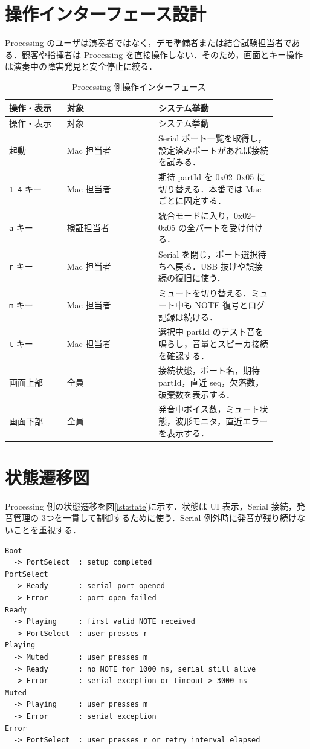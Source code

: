 \documentclass[lualatex,book,openany,paper=a4paper,jafontsize=11.5pt,jafontscale=1.05]{jlreq}
\begin{document}
\section{操作インターフェース設計}
Processing のユーザは演奏者ではなく，デモ準備者または結合試験担当者である．観客や指揮者は
Processing を直接操作しない．そのため，画面とキー操作は演奏中の障害発見と安全停止に絞る．

\begin{longtable}{p{0.19\linewidth}p{0.30\linewidth}p{0.39\linewidth}}
\caption{Processing 側操作インターフェース}\label{tab:ui}\\
\hline
操作・表示 & 対象 & システム挙動 \\
\hline
\endfirsthead
\hline
操作・表示 & 対象 & システム挙動 \\
\hline
\endhead
起動 & Mac 担当者 & Serial ポート一覧を取得し，設定済みポートがあれば接続を試みる． \\
\hline
\texttt{1}--\texttt{4} キー & Mac 担当者 & 期待 partId を 0x02--0x05 に切り替える．本番では Mac ごとに固定する． \\
\hline
\texttt{a} キー & 検証担当者 & 統合モードに入り，0x02--0x05 の全パートを受け付ける． \\
\hline
\texttt{r} キー & Mac 担当者 & Serial を閉じ，ポート選択待ちへ戻る．USB 抜けや誤接続の復旧に使う． \\
\hline
\texttt{m} キー & Mac 担当者 & ミュートを切り替える．ミュート中も NOTE 復号とログ記録は続ける． \\
\hline
\texttt{t} キー & Mac 担当者 & 選択中 partId のテスト音を鳴らし，音量とスピーカ接続を確認する． \\
\hline
画面上部 & 全員 & 接続状態，ポート名，期待 partId，直近 seq，欠落数，破棄数を表示する． \\
\hline
画面下部 & 全員 & 発音中ボイス数，ミュート状態，波形モニタ，直近エラーを表示する． \\
\hline
\end{longtable}

\section{状態遷移図}
Processing 側の状態遷移を図\ref{lst:state}に示す．状態は UI 表示，Serial 接続，発音管理の
3つを一貫して制御するために使う．Serial 例外時に発音が残り続けないことを重視する．

\begin{lstlisting}[style=textdiagram, caption={Processing 音源サブシステムの状態遷移}, label={lst:state}]
Boot
  -> PortSelect  : setup completed
PortSelect
  -> Ready       : serial port opened
  -> Error       : port open failed
Ready
  -> Playing     : first valid NOTE received
  -> PortSelect  : user presses r
Playing
  -> Muted       : user presses m
  -> Ready       : no NOTE for 1000 ms, serial still alive
  -> Error       : serial exception or timeout > 3000 ms
Muted
  -> Playing     : user presses m
  -> Error       : serial exception
Error
  -> PortSelect  : user presses r or retry interval elapsed
\end{lstlisting}
\end{document}
